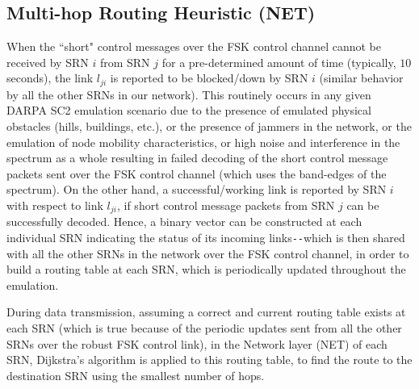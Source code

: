 \subsection{Multi-hop Routing Heuristic (NET)}\label{B.I.VII}
When the ``short" control messages over the FSK control channel cannot be received by SRN $i$ from SRN $j$ for a pre-determined amount of time (typically, $10$ seconds), the link $l_{ji}$ is reported to be blocked/down by SRN $i$ (similar behavior by all the other SRNs in our network). This routinely occurs in any given DARPA SC2 emulation scenario due to the presence of emulated physical obstacles (hills, buildings, etc.), or the presence of jammers in the network, or the emulation of node mobility characteristics, or high noise and interference in the spectrum as a whole resulting in failed decoding of the short control message packets sent over the FSK control channel (which uses the band-edges of the spectrum). On the other hand, a successful/working link is reported by SRN $i$ with respect to link $l_{ji}$, if short control message packets from SRN $j$ can be successfully decoded. Hence, a binary vector can be constructed at each individual SRN indicating the status of its incoming links\texttt{-{}-}which is then shared with all the other SRNs in the network over the FSK control channel, in order to build a routing table at each SRN, which is periodically updated throughout the emulation.

During data transmission, assuming a correct and current routing table exists at each SRN (which is true because of the periodic updates sent from all the other SRNs over the robust FSK control link), in the Network layer (NET) of each SRN, Dijkstra's algorithm is applied to this routing table, to find the route to the destination SRN using the smallest number of hops.
